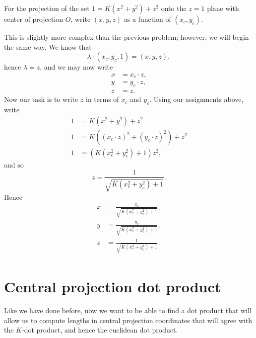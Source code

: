 \documentclass{ximera}
\begin{document}
\begin{problem}
  For the projection of the set $1=K\left(x^{2}+y^{2}\right)+z^{2} $
  onto the $z=1$ plane with center of projection $O$, write $(x,y,z)$
  as a function of $(x_{c},y_{c})$.
  \begin{freeResponse}
    This is slightly more complex than the previous problem; however,
    we will begin the same way. We know that
    \[
    \lambda\cdot(x_{c},y_{c},1)=(x,y,z),
    \]
    hence $\lambda=z$, and we may now write
    \begin{align*}
      x &= x_c\cdot z,\\
      y &= y_c\cdot z,\\
      z &= z.
    \end{align*}
    Now our task is to write $z$ in terms of $x_c$ and $y_c$. Using our assignments above, write
    \begin{align*}
      1 &= K\left(x^2 + y^2\right) + z^2\\
      1 &= K\left((x_c\cdot z)^2 + (y_c\cdot z)^2\right) + z^2\\
      1 &= \left(K\left(x_c^2 + y_c^2\right)+1\right)z^2,
    \end{align*}
    and so
    \[
    z = \frac{1}{\sqrt{K\left(x_c^2 + y_c^2\right)+1}}.
    \]
    Hence
    \begin{align*}
      x &= \frac{x_c}{\sqrt{K\left(x_c^2 + y_c^2\right)+1}},\\
      y &= \frac{y_c}{\sqrt{K\left(x_c^2 + y_c^2\right)+1}},\\
      z &= \frac{1}{\sqrt{K\left(x_c^2 + y_c^2\right)+1}}.\\
    \end{align*}
  \end{freeResponse}
\end{problem}






\section{Central projection dot product}

Like we have done before, now we want to be able to find a dot product
that will allow us to compute lengths in central projection
coordinates that will agree with the $K$-dot product, and hence the
euclidean dot product.
\end{document}
